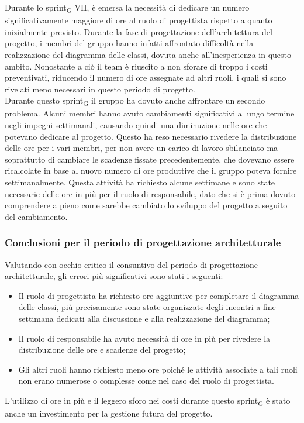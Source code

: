 Durante lo sprint\textsubscript{G} VII, è emersa la necessità di dedicare un numero significativamente maggiore di ore al ruolo di progettista rispetto a quanto inizialmente previsto. Durante la fase di progettazione dell'architettura del progetto, i membri del gruppo hanno infatti affrontato difficoltà nella realizzazione del diagramma delle classi, dovuta anche all'inesperienza in questo ambito. Nonostante a ciò il team è riuscito a non sforare di troppo i costi preventivati, riducendo il numero di ore assegnate ad altri ruoli, i quali si sono rivelati meno necessari in questo periodo di progetto. \\
Durante questo sprint\textsubscript{G} il gruppo ha dovuto anche affrontare un secondo problema. Alcuni membri hanno avuto cambiamenti significativi a lungo termine negli impegni settimanali, causando quindi una diminuzione nelle ore che potevano dedicare al progetto. Questo ha reso necessario rivedere la distribuzione delle ore per i vari membri, per non avere un carico di lavoro sbilanciato ma soprattutto di cambiare le scadenze fissate precedentemente, che dovevano essere ricalcolate in base al nuovo numero di ore produttive che il gruppo poteva fornire settimanalmente. Questa attività ha richiesto alcune settimane e sono state necessarie delle ore in più per il ruolo di responsabile, dato che si è prima dovuto comprendere a pieno come sarebbe cambiato lo sviluppo del progetto a seguito del cambiamento. 

\subsubsection{Conclusioni per il periodo di progettazione architetturale}

Valutando con occhio critico il consuntivo del periodo di progettazione architetturale, gli errori più significativi sono stati i seguenti:
\begin{itemize}
	\item Il ruolo di progettista ha richiesto ore aggiuntive per completare il diagramma delle classi, più precisamente sono state organizzate degli incontri a fine settimana dedicati alla discussione e alla realizzazione del diagramma;
	\item Il ruolo di responsabile ha avuto necessità di ore in più per rivedere la distribuzione delle ore e scadenze del progetto;
	\item Gli altri ruoli hanno richiesto meno ore poiché le attività associate a tali ruoli non erano numerose o complesse come nel caso del ruolo di progettista.
\end{itemize}
L'utilizzo di ore in più e il leggero sforo nei costi durante questo sprint\textsubscript{G} è stato anche un investimento per la gestione futura del progetto.


